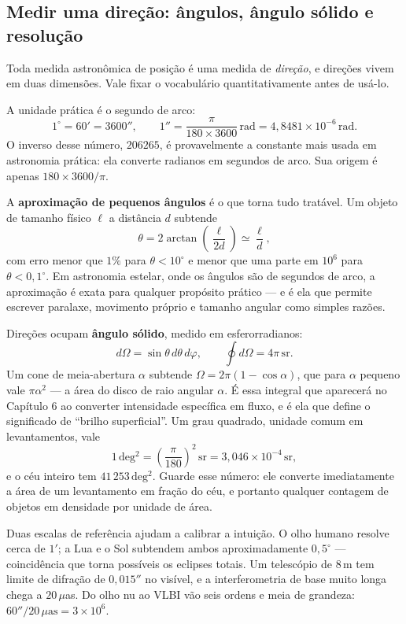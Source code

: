 \documentclass[11pt,a4paper]{article}
\begin{document}
\subsection*{Medir uma direção: ângulos, ângulo sólido e resolução}

Toda medida astronômica de posição é uma medida de \emph{direção}, e direções vivem em duas dimensões. Vale fixar o vocabulário quantitativamente antes de usá-lo.

A unidade prática é o segundo de arco:
\[
1^\circ=60'=3600'',
\qquad
1''=\frac{\pi}{180\times3600}\,\mathrm{rad}=4{,}8481\times10^{-6}\,\mathrm{rad}.
\]
O inverso desse número, $206265$, é provavelmente a constante mais usada em astronomia prática: ela converte radianos em segundos de arco. Sua origem é apenas $180\times3600/\pi$.

A \textbf{aproximação de pequenos ângulos} é o que torna tudo tratável. Um objeto de tamanho físico $\ell$ a distância $d$ subtende
\[
\theta=2\arctan\left(\frac{\ell}{2d}\right)\simeq\frac{\ell}{d},
\]
com erro menor que $1\%$ para $\theta<10^\circ$ e menor que uma parte em $10^{6}$ para $\theta<0{,}1^\circ$. Em astronomia estelar, onde os ângulos são de segundos de arco, a aproximação é exata para qualquer propósito prático --- e é ela que permite escrever paralaxe, movimento próprio e tamanho angular como simples razões.

Direções ocupam \textbf{ângulo sólido}, medido em esferorradianos:
\[
d\Omega=\sin\theta\,d\theta\,d\varphi,
\qquad
\oint d\Omega=4\pi\,\mathrm{sr}.
\]
Um cone de meia-abertura $\alpha$ subtende $\Omega=2\pi(1-\cos\alpha)$, que para $\alpha$ pequeno vale $\pi\alpha^{2}$ --- a área do disco de raio angular $\alpha$. É essa integral que aparecerá no Capítulo 6 ao converter intensidade específica em fluxo, e é ela que define o significado de ``brilho superficial''. Um grau quadrado, unidade comum em levantamentos, vale
\[
1\,\mathrm{deg^{2}}=\left(\frac{\pi}{180}\right)^{2}\,\mathrm{sr}=3{,}046\times10^{-4}\,\mathrm{sr},
\]
e o céu inteiro tem $41\,253\,\mathrm{deg^{2}}$. Guarde esse número: ele converte imediatamente a área de um levantamento em fração do céu, e portanto qualquer contagem de objetos em densidade por unidade de área.

Duas escalas de referência ajudam a calibrar a intuição. O olho humano resolve cerca de $1'$; a Lua e o Sol subtendem ambos aproximadamente $0{,}5^\circ$ --- coincidência que torna possíveis os eclipses totais. Um telescópio de $8\,\mathrm{m}$ tem limite de difração de $0{,}015''$ no visível, e a interferometria de base muito longa chega a $20\,\mu$as. Do olho nu ao VLBI vão seis ordens e meia de grandeza: $60''/20\,\mu\mathrm{as}=3\times10^{6}$.
\end{document}
